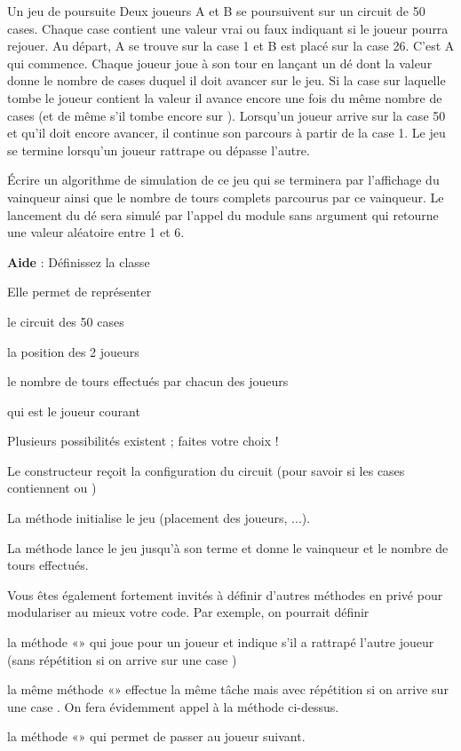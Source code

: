 \begin{Exercice}{Un jeu de poursuite}
	Deux joueurs A et B se poursuivent sur un
	circuit de 50 cases. Chaque case contient une valeur vrai ou faux
	indiquant si le joueur pourra rejouer.
	Au départ, A se trouve sur la case 1 et B est placé sur la case 26.
	C’est A qui commence. Chaque joueur joue à son tour en lançant un dé
	dont la valeur donne le nombre de cases duquel il doit avancer sur le
	jeu. Si la case sur laquelle tombe le joueur contient la valeur
	 il avance encore
	une fois du même nombre de cases (et de même s’il tombe encore sur
	). Lorsqu’un joueur
	arrive sur la case 50 et qu’il doit encore avancer, il continue son
	parcours à partir de la case 1. Le jeu se termine lorsqu’un joueur
	rattrape ou dépasse l’autre.

	Écrire un algorithme de simulation de ce jeu
	qui se terminera par l’affichage du vainqueur ainsi que le nombre de
	tours complets parcourus par ce vainqueur. 
	Le lancement du dé sera simulé par l’appel du module sans argument
	 qui retourne
	une valeur aléatoire entre 1 et 6.

	\textbf{Aide} :	Définissez la classe
	
	Elle permet de représenter
	\begin{liste}
		\item 
			le circuit des 50 cases
		\item 
			la position des 2 joueurs
		\item 
			le nombre de tours effectués par chacun des joueurs
		\item 
			qui est le joueur courant
	\end{liste}
	Plusieurs possibilités existent ; faites votre choix !
	\begin{liste}
		\item 
			Le constructeur reçoit la configuration du circuit (pour savoir si les
			cases contiennent  ou
			)
		\item 
			La méthode  initialise le jeu
			(placement des joueurs, ...).
		\item 
			La méthode  lance le jeu jusqu’à son terme et
			donne le vainqueur et le nombre de tours effectués.
		\item 
			Vous êtes également fortement invités à définir d’autres méthodes en
			privé pour modulariser au mieux votre code. Par exemple, on pourrait
			définir
		\item 
			la méthode «» qui joue pour un joueur et
			indique s'il a rattrapé l’autre joueur (sans
			répétition si on arrive sur une case )
		\item 
			la même méthode «» effectue la même tâche
			mais avec répétition si on arrive sur une case
			. On fera évidemment appel à la méthode
			ci-dessus.
		\item 
			la méthode «» qui permet de passer au
			joueur suivant.
	\end{liste}
	

\end{Exercice}
